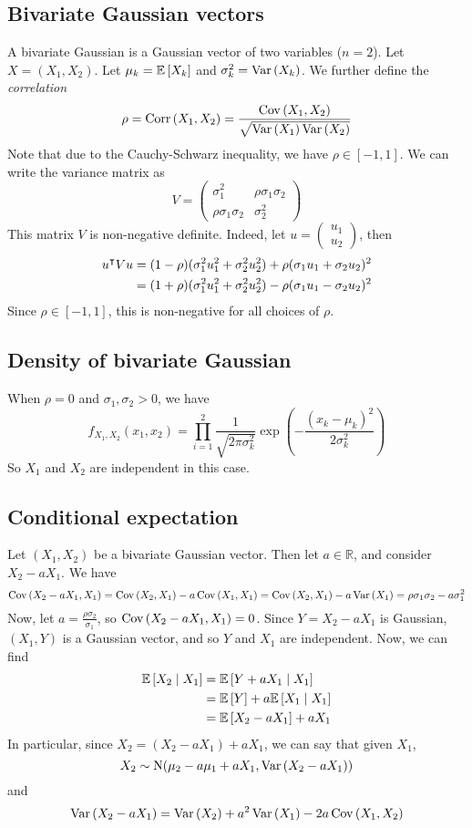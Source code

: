 \subsection{Bivariate Gaussian vectors}
A bivariate Gaussian is a Gaussian vector of two variables (\(n=2\)).
Let \(X = (X_1, X_2)\).
Let \(\mu_k = \mathbb{E}\left[{X_k}\right]\) and \(\sigma_k^2 = \operatorname{Var}\left({X_k}\right)\).
We further define the \textit{correlation}
\[
	\rho = \operatorname{Corr}\left({X_1, X_2}\right) = \frac{\operatorname{Cov}\left({X_1, X_2}\right)}{\sqrt{\operatorname{Var}\left({X_1}\right)\operatorname{Var}\left({X_2}\right)}}
\]
Note that due to the Cauchy-Schwarz inequality, we have \(\rho \in [-1, 1]\).
We can write the variance matrix as
\[
	V = \begin{pmatrix}
		\sigma_1^2             & \rho \sigma_1 \sigma_2 \\
		\rho \sigma_1 \sigma_2 & \sigma_2^2
	\end{pmatrix}
\]
This matrix \(V\) is non-negative definite.
Indeed, let \(u = \begin{pmatrix} u_1 \\ u_2 \end{pmatrix}\), then
\begin{align*}
	u^\intercal V u & = (1-\rho)(\sigma_1^2 u_1^2 + \sigma_2^2 u_2^2) + \rho(\sigma_1 u_1 + \sigma_2 u_2)^2 \\
	                 & = (1+\rho)(\sigma_1^2 u_1^2 + \sigma_2^2 u_2^2) - \rho(\sigma_1 u_1 - \sigma_2 u_2)^2
\end{align*}
Since \(\rho \in [-1, 1]\), this is non-negative for all choices of \(\rho\).

\subsection{Density of bivariate Gaussian}
When \(\rho = 0\) and \(\sigma_1, \sigma_2 > 0\), we have
\[
	f_{X_1, X_2}(x_1, x_2) = \prod_{i=1}^2 \frac{1}{\sqrt{2\pi \sigma_k^2}} \exp(-\frac{(x_k - \mu_k)^2}{2\sigma_k^2})
\]
So \(X_1\) and \(X_2\) are independent in this case.

\subsection{Conditional expectation}
Let \((X_1, X_2)\) be a bivariate Gaussian vector.
Then let \(a \in \mathbb R\), and consider \(X_2 - aX_1\).
We have
\[
	\operatorname{Cov}\left({X_2 - aX_1, X_1}\right) = \operatorname{Cov}\left({X_2, X_1}\right) - a\operatorname{Cov}\left({X_1, X_1}\right) = \operatorname{Cov}\left({X_2, X_1}\right) - a \operatorname{Var}\left({X_1}\right) = \rho \sigma_1 \sigma_2 - a\sigma_1^2
\]
Now, let \(a = \frac{\rho \sigma_2}{\sigma_1}\), so \(\operatorname{Cov}\left({X_2 - aX_1, X_1}\right) = 0\).
Since \(Y = X_2 - aX_1\) is Gaussian, \((X_1, Y)\) is a Gaussian vector, and so \(Y\) and \(X_1\) are independent.
Now, we can find
\begin{align*}
	\mathbb{E}\left[{X_2 \mid X_1}\right] & = \mathbb{E}\left[{Y + aX_1 \mid X_1}\right]          \\
	                      & = \mathbb{E}\left[{Y}\right] + a\mathbb{E}\left[{X_1 \mid X_1}\right] \\
	                      & = \mathbb{E}\left[{X_2 - aX_1}\right] + aX_1
\end{align*}
In particular, since \(X_2 = (X_2 - aX_1) + aX_1\), we can say that given \(X_1\),
\[
	X_2 \sim \mathrm{N}(\mu_2 - a\mu_1 + aX_1, \operatorname{Var}\left({X_2 - aX_1}\right))
\]
and
\[
	\operatorname{Var}\left({X_2 - aX_1}\right) = \operatorname{Var}\left({X_2}\right) + a^2 \operatorname{Var}\left({X_1}\right) - 2a \operatorname{Cov}\left({X_1, X_2}\right)
\]

